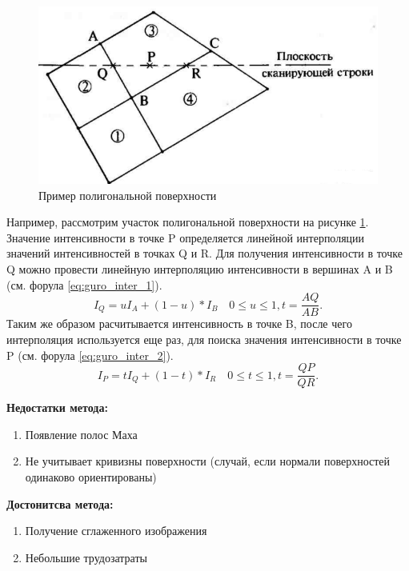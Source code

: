 \documentclass[a4paper,14pt, unknownkeysallowed]{extreport}
\begin{document}
\begin{figure}[H]
	\centering
	\includegraphics{guro}
	\caption{Пример полигональной поверхности}
	\label{fig:guro_polygon}
\end{figure} 

Например, рассмотрим участок полигональной поверхности на рисунке \ref{fig:guro_polygon}.
Значение интенсивности в точке P
определяется линейной интерполяции значений интенсивностей в точках Q и R.
Для получения интенсивности в точке Q можно провести линейную интерполяцию интенсивности в вершинах A и B (см. форула \ref{eq:guro_inter_1}).
\begin{equation} 
	I_Q = uI_A+(1-u)*I_B  \quad 0 \leq u \leq 1, t = \frac{AQ}{AB}.
	\label{eq:guro_inter_1}
\end{equation}
Таким же образом расчитывается интенсивность в точке B, после чего интерполяция используется еще раз, для поиска значения интенсивности в точке P 
(см. форула \ref{eq:guro_inter_2}). \cite{Rodgers}
\begin{equation} 
	I_P = tI_Q+(1-t)*I_R  \quad 0 \leq t \leq 1, t = \frac{QP}{QR}.
	\label{eq:guro_inter_2}
\end{equation}

\textbf{Недостатки метода:}
\begin{enumerate}
	\item Появление полос Маха 
	\item Не учитывает кривизны поверхности (случай, если нормали поверхностей одинаково ориентированы)
\end{enumerate}

\textbf{Достонитсва метода:}
\begin{enumerate}
	\item Получение сглаженного изображения
	\item Небольшие трудозатраты
\end{enumerate}
\end{document}
